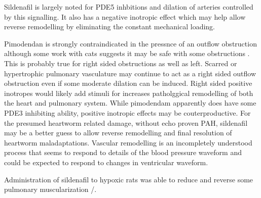 
Sildenafil is largely noted for PDE5 inhbitions and dilation
of arteries controlled by this signalling. It also has a
negative inotropic effect which may help allow reverse remodelling
by eliminating the constant mechanical loading. 


Pimodendan is strongly contraindicated in the pressnce of an outflow
obstruction although some work with cats suggests it may be
safe with some obstructions
\cite{Ward_Kussin_Tropf_Retrospective_evaluation_2020}
.  This is probably true for right sided obstructions
as well as left. Scarred or hypertrophic pulmonary vasculature 
may continue to act as a right sided outflow obstruction even if
some moderate dilation can be induced. Right sided positive inotropes
would likely add stimuli for increases patholggical remodelling of both 
the heart and pulmonary system.  While pimodendam apparently does have
some PDE3 inhibiting ability, positive inotropic effects may be couterproductive. For the presumed heartworm related damage, without echo proven
PAH, sildenafil may be a better guess to allow reverse
remodelling and final resolution of heartworm maladaptations.
Vascular remodelling is an incompletely understood process that
seems to respond to details of the blood pressure waveform
\cite{Brown_Diederich_Good_Vascular_Smooth_Muscle_Remodeling_2018}
and could be expected to respond to changes in ventricular
waveform.




Administration of sildenafil to hypoxic rats was able to reduce
and reverse some pulmonary muscularization
\cite{Sebkhi_Strange_Phillips_Phosphodiesterase_Type_2003}/.

